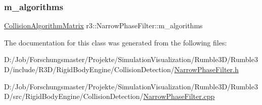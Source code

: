\subsubsection{\texorpdfstring{m\+\_\+algorithms}{m\_algorithms}}
{\footnotesize\ttfamily \mbox{\hyperlink{classr3_1_1_collision_algorithm_matrix}{Collision\+Algorithm\+Matrix}} r3\+::\+Narrow\+Phase\+Filter\+::m\+\_\+algorithms\hspace{0.3cm}{\ttfamily [protected]}}



The documentation for this class was generated from the following files\+:\begin{DoxyCompactItemize}
\item 
D\+:/\+Job/\+Forschungsmaster/\+Projekte/\+Simulation\+Visualization/\+Rumble3\+D/\+Rumble3\+D/include/\+R3\+D/\+Rigid\+Body\+Engine/\+Collision\+Detection/\mbox{\hyperlink{_narrow_phase_filter_8h}{Narrow\+Phase\+Filter.\+h}}\item 
D\+:/\+Job/\+Forschungsmaster/\+Projekte/\+Simulation\+Visualization/\+Rumble3\+D/\+Rumble3\+D/src/\+Rigid\+Body\+Engine/\+Collision\+Detection/\mbox{\hyperlink{_narrow_phase_filter_8cpp}{Narrow\+Phase\+Filter.\+cpp}}\end{DoxyCompactItemize}
